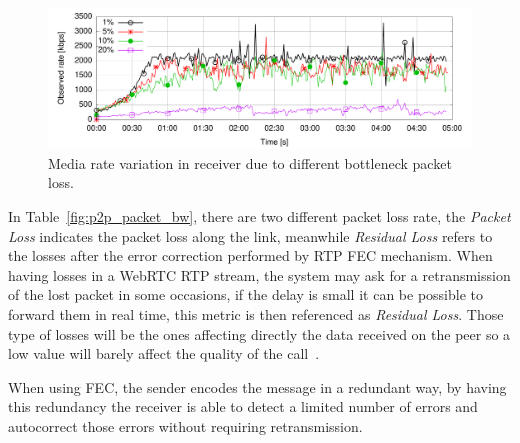  \begin{figure}[h]
  \centering
    \includegraphics[width=1\textwidth]{./figures/plr-all.pdf}
      \caption[Media rate variation in receiver due to different bottleneck packet loss]{Media rate variation in receiver due to different bottleneck packet loss.}
	\label{fig:plr-all}
\end{figure}

In Table~\ref{fig:p2p_packet_bw}, there are two different packet loss rate, the {\it Packet Loss} indicates the packet loss along the link, meanwhile {\it Residual Loss} refers to the losses after the error correction performed by RTP FEC mechanism. When having losses in a WebRTC RTP stream, the system may ask for a retransmission of the lost packet in some occasions, if the delay is small it can be possible to forward them in real time, this metric is then referenced as {\it Residual Loss}. Those type of losses will be the ones affecting directly the data received on the peer so a low value will barely affect the quality of the call~\cite{residualLoss}. 

When using FEC, the sender encodes the message in a redundant way, by having this redundancy the receiver is able to detect a limited number of errors and autocorrect those errors without requiring retransmission. 

%
%
%

